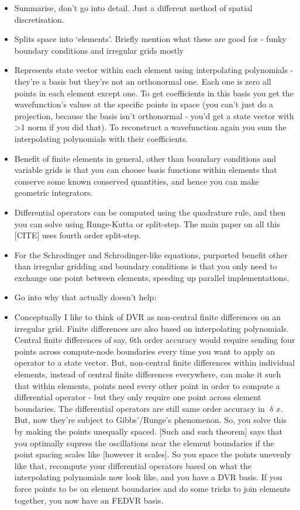 \begin{itemize}
    \item Summarise, don't go into detail. Just a different method of spatial discretisation.
    \item{Splits space into `elements'. Briefly mention what these are good for - funky boundary conditions and irregular grids mostly}
    \item Represents state vector within each element using interpolating polynomials - they're a basis but they're not an orthonormal one. Each one is zero all points in each element except one. To get coefficients in this basis you get the wavefunction's values at the specific points in space (you can't just do a projection, because the basis isn't orthonormal - you'd get a state vector with >1 norm if you did that). To reconstruct a wavefunction again you sum the interpolating polynomials with their coefficients.
    \item Benefit of finite elements in general, other than boundary conditions and variable grids is that you can choose basis functions within elements that conserve some known conserved quantities, and hence you can make geometric integrators.
    \item Differential operators can be computed using the quadrature rule, and then you can solve using Runge-Kutta or split-step. The main paper on all this [CITE] uses fourth order split-step.
    \item For the Schrodinger and Schrodinger-like equations, purported benefit other than irregular gridding and boundary conditions is that you only need to exchange one point between elements, speeding up parallel implementations.
    \item Go into why that actually doesn't help:
    \item Conceptually I like to think of DVR as non-central finite differences on an irregular grid. Finite differences are also based on interpolating polynomials. Central finite differences of say, 6th order accuracy would require sending four points across compute-node boundaries every time you want to apply an operator to a state vector. But, non-central finite differences within individual elements, instead of central finite differences everywhere, can make it such that within elements, points need every other point in order to compute a differential operator - but they only require one point across element boundaries. The differential operators are still same order accuracy in $\updelta x$. But, now they're subject to Gibbs'/Runge's phenomenon. So, you solve this by making the points unequally spaced. [Such and such theorem] says that you optimally supress the oscillations near the element boundaries if the point spacing scales like [however it scales]. So you space the points unevenly like that, recompute your differential operators based on what the interpolating polynomials now look like, and you have a DVR basis. If you force points to be on element boundaries and do some tricks to join elements together, you now have an FEDVR basis.

\end{itemize}
